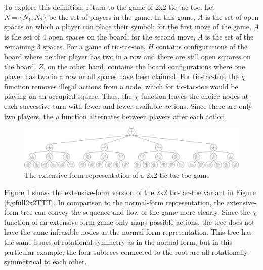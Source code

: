To explore this definition, return to the game of 2x2 tic-tac-toe. Let $N=\{N_1, N_2\}$ be the set of players in the game. In this game, $A$ is the set of open spaces on which a player can place their symbol; for the first move of the game, $A$ is the set of 4 open spaces on the board, for the second move, $A$ is the set of the remaining 3 spaces. For a game of tic-tac-toe, $H$ contains configurations of the board where neither player has two in a row and there are still open squares on the board. $Z$, on the other hand, contains the board configurations where one player has two in a row or all spaces have been claimed. For tic-tac-toe, the $\chi$ function removes illegal actions from a node, which for tic-tac-toe would be playing on an occupied square. Thus, the $\chi$ function leaves the choice nodes at each successive turn with fewer and fewer available actions. Since there are only two players, the $\rho$ function alternates between players after each action.

\begin{figure}[H]
  \centering
  \includegraphics[width=16cm]{figures/TTTExtTree.png}
  \caption{The extensive-form representation of a 2x2 tic-tac-toe game}
  \label{fig:2x2TTTExtForm}
\end{figure}

Figure \ref{fig:2x2TTTExtForm} shows the extensive-form version of the 2x2 tic-tac-toe variant in Figure \ref{fig:full2x2TTT}. In comparison to the normal-form representation, the extensive-form tree can convey the sequence and flow of the game more clearly. Since the $\chi$ function of an extensive-form game only maps possible actions, the tree does not have the same infeasible nodes as the normal-form representation. This tree has the same issues of rotational symmetry as in the normal form, but in this particular example, the four subtrees connected to the root are all rotationally symmetrical to each other.

